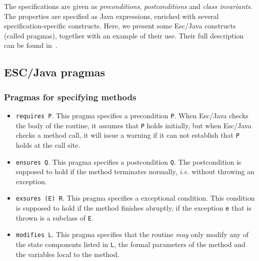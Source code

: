 \documentclass[a4paper]{llncs}
\begin{document}
The specifications are given as
\textit{preconditions}, \textit{postconditions} and \textit{class
invariants}. The properties are specified as Java expressions,
enriched with several specification-specific constructs. Here, we
present some Esc/Java constructs (called pragmas), together with an
example of their use. Their full description can be found
in~\cite{LeinoNS00}.

\subsection{ESC/Java pragmas}
\subsubsection{Pragmas for specifying methods}
\begin{itemize}
\item{\texttt{requires P}.}
This pragma specifies a precondition {\tt P}.
When Esc/Java checks the body of the
routine, it assumes that \texttt{P} holds initially, but when
Esc/Java checks a method call, it will issue a warning if
it can not establish that \texttt{P} holds at the call site.

\item{\texttt{ensures Q}.}
This pragma specifies a postcondition \texttt{Q}. The postcondition 
is supposed to hold if the method terminates normally, \emph{i.e.}
without throwing an exception.

\item{\texttt{exsures (E) R}.}
This pragma specifies a exceptional condition. This condition is
supposed to hold if the method finishes abruptly, if
the exception \texttt{e} that is thrown is a subclass of \texttt{E}.

\item{\texttt{modifies L}.}
This pragma specifies that the routine \emph{may} only modify any of
the state components listed in \texttt{L}, the formal parameters of
the method and the variables local to the method.
\end{itemize}
\end{document}
